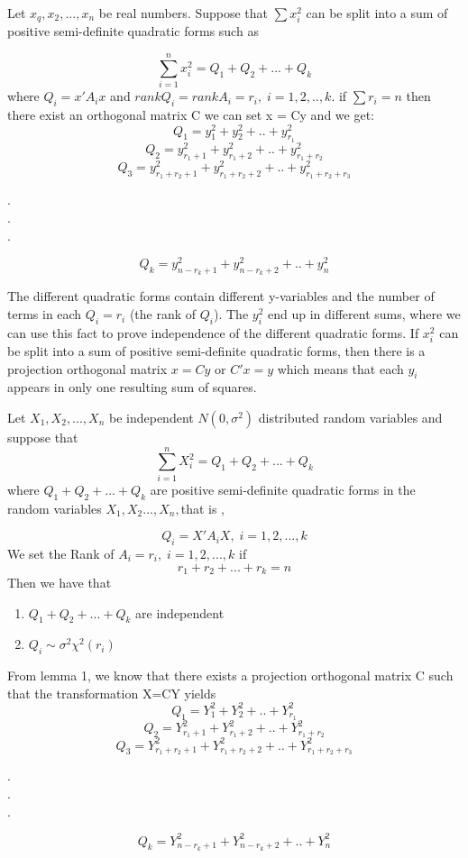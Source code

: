 \bLemma 
Let $x_q,x_2,...,x_n$ be real  numbers. Suppose that $\sum x_i^2$ can be split into a sum of positive semi-definite quadratic forms such as

\[
\sum_{i=1}^n x_i^2 = Q_1+Q_2+...+Q_k
\]
where $Q_i = x'A_ix$ and $rank Q_i =rank A_i = r_i, \; i = 1,2,..,k$. if $\sum r_i =n$ then there exist an orthogonal matrix C we can set x = Cy and we get:
\[
Q_1 = y_1^2+y_2^2+..+y_{r_1}^2
\]
\[
Q_2 =y_{r_1+1}^2+y_{r_1+2}^2+..+y_{r_1+r_2}^2
\]
\[
Q_3 = y_{r_1+r_2+1}^2+y_{r_1+r_2+2}^2+..+y_{r_1+r_2+r_3}^2
\]
\begin{center}
.\\
.\\
.\\
\end{center}
\[
Q_k = y_{n-r_k+1}^2 + y_{n-r_k+2}^2+..+y_n^2
\]

The different quadratic forms contain different y-variables and the number of terms in each $Q_i = r_i$ (the rank of $Q_i$). The $y_i^2$ end up in different sums, where we can use this fact to prove independence of the different quadratic forms. If $x_i^2$ can be split into a sum of positive semi-definite quadratic forms, then there is a projection orthogonal matrix $x=Cy$ or $C'x=y$ which means that each $y_i$ appears in only one resulting sum of squares. 
\eLemma

\Proof 
Let $X_1, X_2,...,X_n $ be independent  $N(0,\sigma^2)$ distributed random variables and suppose that 
\[
\sum_{i=1}^n X_i^2 = Q_1 +Q_2+...+Q_k
\]
where $Q_1 +Q_2+...+Q_k$ are positive semi-definite quadratic forms in the random variables $X_1, X_2...,X_n, $that is ,

\[
Q_i = X'A_iX, \; i = 1,2,...,k
\]
We set the Rank of $A_i=r_i, \; i=1,2,...,k$ if 
\[
r_1+r_2+...+r_k =n
\]
Then we have that 
\begin{enumerate}
\item $Q_1 +Q_2+...+Q_k$ are independent
\item $Q_i \sim \sigma^2\chi^2(r_i)$
\end{enumerate}
From lemma 1, we know that there exists a projection orthogonal matrix C such that the transformation X=CY yields
\[
Q_1 = Y_1^2+Y_2^2+..+Y_{r_1}^2
\]
\[
Q_2 =Y_{r_1+1}^2+Y_{r_1+2}^2+..+Y_{r_1+r_2}^2
\]
\[
Q_3 = Y_{r_1+r_2+1}^2+Y_{r_1+r_2+2}^2+..+Y_{r_1+r_2+r_3}^2
\]
\begin{center}
.\\.\\.\\
\end{center}
\[
Q_k = Y_{n-r_k+1}^2 + Y_{n-r_k+2}^2+..+Y_n^2
\]

